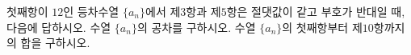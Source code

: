 첫째항이 $12$인 등차수열 $\{a_n\}$에서 제$3$항과 제$5$항은 절댓값이 같고 부호가 반대일 때, 다음에 답하시오.
 수열 $\{a_n\}$의 공차를 구하시오.
 수열 $\{a_n\}$의 첫째항부터 제$10$항까지의 합을 구하시오.
